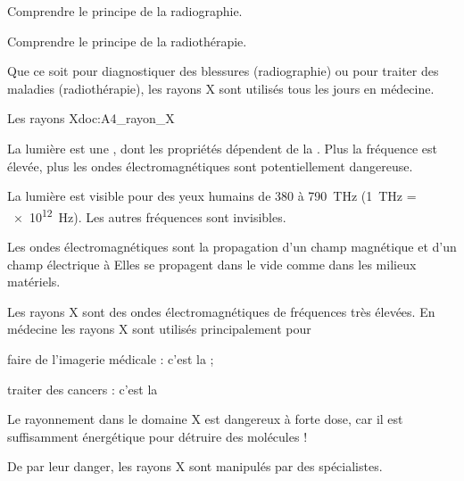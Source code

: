 \teteTermStssImag

\vspace*{-36pt}


\begin{objectifs}
  \item Comprendre le principe de la radiographie.
  \item Comprendre le principe de la radiothérapie.
\end{objectifs}

\begin{contexte}
  Que ce soit pour diagnostiquer des blessures (radiographie) ou pour traiter des maladies (radiothérapie), les rayons X sont utilisés tous les jours en médecine.

\end{contexte}


\begin{doc}{Les rayons X}{doc:A4_rayon_X}
  \begin{center}  
  \end{center}
  
  La lumière est une , dont les propriétés dépendent de la .
  Plus la fréquence est élevée, plus les ondes électromagnétiques sont potentiellement dangereuse.
  
  La lumière est visible pour des yeux humains de 380 à \qty{790}{\tera\hertz} (\qty{1}{\tera\hertz} = \qty{e12}{\hertz}).
  Les autres fréquences sont invisibles.

  Les ondes électromagnétiques sont la propagation d'un champ magnétique et d'un champ électrique à 
  Elles se propagent dans le vide comme dans les milieux matériels.
  
  \begin{encart}
    Les rayons X sont des ondes électromagnétiques de fréquences très élevées.
    En médecine les rayons X sont utilisés principalement pour
    \begin{listePoints}  
      \item faire de l'imagerie médicale : c'est la  ;
      \item traiter des cancers : c'est la 
    \end{listePoints}
  \end{encart}

  Le rayonnement dans le domaine X est dangereux à forte dose, car il est suffisamment énergétique pour détruire des molécules !

  De par leur danger, les rayons X sont manipulés par des spécialistes.
\end{doc}

